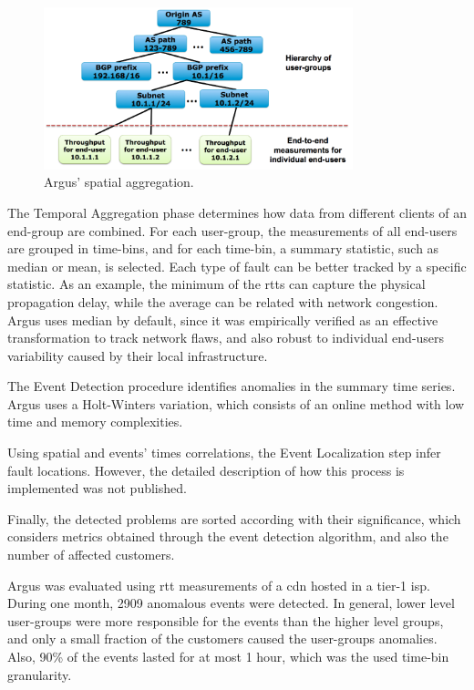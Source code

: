 \begin{figure}[H]
    \centering
    \includegraphics[width=0.8\textwidth]{./figures/literature_review/argus_spatial_aggregation.png}
    \caption{Argus' spatial aggregation.~\cite{argus_end_to_end_service_anomaly_detection_and_localization_from_an_isps_point_of_view}}
\label{fig:argus_spatial_aggregation}
\end{figure}%

The Temporal Aggregation phase determines how data
from different clients of an end-group are combined.
For each user-group, the
measurements of all end-users are grouped in time-bins, and for each
time-bin, a summary statistic, such as median or mean, is selected.
Each type of fault can be better tracked by a specific statistic.
As an example, the
minimum of the \glspl*{rtt} can capture the physical propagation delay,
while the average can be related with network congestion. Argus uses median
by default, since it was empirically verified as an
effective transformation to track network flaws, and also robust to individual
end-users variability caused by their local infrastructure.

The Event Detection procedure identifies anomalies in the
summary time series. Argus uses a Holt-Winters variation,  which consists of
an online method with low time and memory complexities.

Using spatial and events' times correlations, the Event Localization step
infer fault locations.
However, the detailed description of how this
process is implemented was not published.

Finally, the detected problems are sorted according with
their significance, which considers metrics obtained
through the event detection
algorithm, and also the number of affected customers.

Argus was evaluated using \gls*{rtt} measurements of a \gls*{cdn} hosted in a
tier-1 \gls*{isp}\@.
During one month, 2909 anomalous events were detected.
In general, lower level user-groups were more responsible
for the events than the higher level groups,
and only a small fraction of the customers caused the user-groups anomalies.
Also, 90\% of the events lasted for
at most 1 hour, which was the used time-bin granularity.


